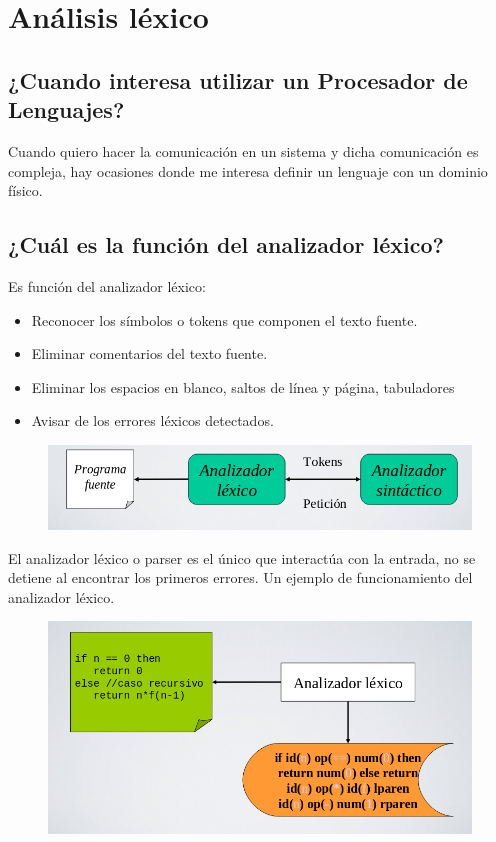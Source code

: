 \chapter{Análisis léxico}
\section{¿Cuando interesa utilizar un Procesador de Lenguajes?}
Cuando quiero hacer la comunicación en un sistema y dicha comunicación es compleja, hay ocasiones donde me interesa definir un lenguaje con un dominio físico.

\section{¿Cuál es la función del analizador léxico?}
Es función del analizador léxico: 
\begin{itemize}
	\item Reconocer los símbolos o tokens que componen el texto fuente.
	\item Eliminar comentarios del texto fuente.
	\item Eliminar los espacios en blanco, saltos de línea y página, tabuladores
	\item Avisar de los errores léxicos detectados.
\end{itemize}

\begin{figure}[h]
	\centering
	\includegraphics[width=0.7\linewidth]{img/lex1}
	\caption{}
	\label{fig:lex1}
\end{figure}

El analizador léxico o parser es el único que interactúa con la entrada, no se detiene al encontrar los primeros errores.
\clearpage
Un ejemplo de funcionamiento del analizador léxico.
\begin{figure}[h]
	\centering
	\includegraphics[width=0.7\linewidth]{img/lex2}
	\caption{}
	\label{fig:lex2}
\end{figure}

